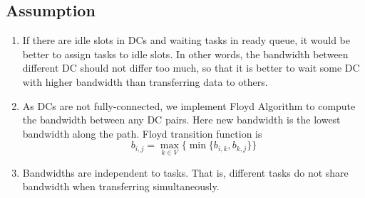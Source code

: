 

\subsection{Assumption}

\begin{enumerate}
    \item If there are idle slots in DCs and waiting tasks in ready queue, it would be better to assign tasks to idle slots. In other words, the bandwidth between different DC should not differ too much, so that it is better to wait some DC with higher bandwidth than transferring data to others.
    \item As DCs are not fully-connected, we implement Floyd Algorithm to compute the bandwidth between any DC pairs. Here new bandwidth is the lowest bandwidth along the path. Floyd transition function is  
    \begin{equation*}
        b_{i,j}=\max_{k\in V} \{ \min\{b_{i,k},b_{k,j}\} \}
    \end{equation*}
    
    \item Bandwidths are independent to tasks. That is, different tasks do not share bandwidth when transferring simultaneously.  
\end{enumerate}